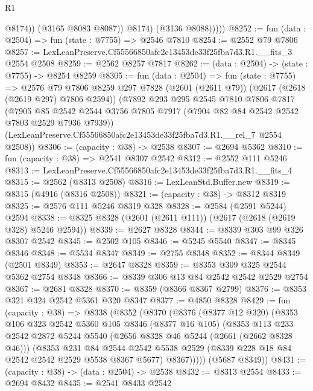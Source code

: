 \begin{lexlean}{R1}
\begin{coremodule}
                    @8174))
                (@3165 @8083 @8087))
              @8174)
            (@3136 @8088)))))
@8252 := fun (data : @2504) => fun (state : @7755) => @2546 @7810
@8254 := @2552 @79 @7806
@8257 := LexLeanPreserve.Cf55566850afc2e13453de33f25fba7d3.R1.__fits_3 @2554 @2508
@8259 := @2562 @8257 @7817
@8262 := (data : @2504) -> (state : @7755) -> @8254 @8259
@8305 := fun (data : @2504) =>
  fun (state : @7755) =>
  @2576
    @79
    @7806
    @8259
    @297
    @7828
    (@2601 (@2611 @79))
    (@2617 (@2618 (@2619 @297) @7806 @2594))
    (@7892
      @293
      @295
      @2545
      @7810
      @7806
      @7817
      (@7905 @85 @2542 @2544 @3756 @7805 @7917 (@7904 @82 @84 @2542 @2542 @7803 @2529 @7936 @7939))
      (LexLeanPreserve.Cf55566850afc2e13453de33f25fba7d3.R1.__rel_7 @2554 @2508))
@8306 := (capacity : @38) -> @2538
@8307 := @2694 @5362
@8310 := fun (capacity : @38) => @2541 @8307 @2542
@8312 := @2552 @111 @5246
@8313 := LexLeanPreserve.Cf55566850afc2e13453de33f25fba7d3.R1.__fits_4
@8315 := @2562 (@8313 @2508)
@8316 := LexLeanStd.Buffer.new
@8319 := @8315 (@4916 (@8316 @2508))
@8321 := (capacity : @38) -> @8312 @8319
@8325 := @2576 @111 @5246 @8319 @328
@8328 := @2584 (@2591 @5244) @2594
@8338 := @8325 @8328 (@2601 (@2611 @111)) (@2617 (@2618 (@2619 @328) @5246 @2594))
@8339 := @2627 @8328
@8344 := @8339 @303 @99 @326 @8307 @2542
@8345 := @2502 @105
@8346 := @5245 @5540
@8347 := @8345 @8346
@8348 := @5534 @8347
@8349 := @2755 @8348
@8352 := @8344 @8349 (@2501 @8349)
@8353 := @2647 @8328
@8359 := @8353 @309 @325 @2544 @5362 @2754 @8348
@8366 := @8339 @306 @13 @84 @2542 @2542 @2529 @2754
@8367 := @2681 @8328
@8370 := @8359 (@8366 @8367 @2799)
@8376 := @8353 @321 @324 @2542 @5361 @320 @8347
@8377 := @4850 @8328
@8429 := fun (capacity : @38) =>
  @8338
    (@8352
      (@8370
        (@8376
          (@8377 @12 @320)
          (@8353
            @106
            @323
            @2542
            @5360
            @105
            @8346
            (@8377 @16 @105)
            (@8353
              @113
              @233
              @2542
              @2872
              @5244
              @5540
              (@2656 @8328 @46 @5244 (@2661 (@2662 @8328 @46)))
              (@8353
                @231
                @84
                @2544
                @2542
                @5538
                @2529
                (@8339 @228 @18 @84 @2542 @2542 @2529 @5538 @8367 @5677)
                @8367)))))
      (@5687 @8349))
@8431 := (capacity : @38) -> (data : @2504) -> @2538
@8432 := @8313 @2554
@8433 := @2694 @8432
@8435 := @2541 @8433 @2542

\end{coremodule}
\end{lexlean}
